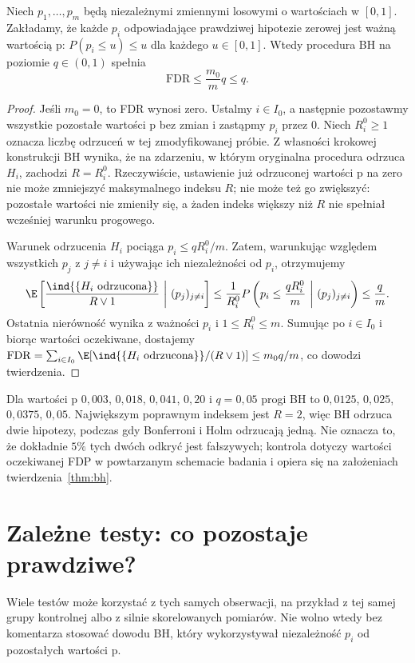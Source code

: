\begin{twierdzenie}
\label{thm:bh}
Niech $p_1,\ldots,p_m$ będą niezależnymi zmiennymi
losowymi o wartościach w $[0,1]$. Zakładamy, że
każde $p_i$ odpowiadające prawdziwej hipotezie zerowej
jest ważną wartością p:
$P(p_i\le u)\le u$ dla każdego $u\in[0,1]$.
Wtedy procedura BH na poziomie $q\in(0,1)$ spełnia
\[
 \mathrm{FDR}\le\frac{m_0}{m}q\le q.
\]
\end{twierdzenie}
\begin{proof}
Jeśli $m_0=0$, to FDR wynosi zero. Ustalmy
$i\in I_0$, a następnie pozostawmy wszystkie pozostałe
wartości p bez zmian i zastąpmy $p_i$ przez $0$.
Niech $R_i^0\ge1$ oznacza liczbę odrzuceń w tej
zmodyfikowanej próbie. Z własności krokowej konstrukcji
BH wynika, że na zdarzeniu, w którym oryginalna
procedura odrzuca $H_i$, zachodzi $R=R_i^0$.
Rzeczywiście, ustawienie już odrzuconej wartości p na
zero nie może zmniejszyć maksymalnego indeksu $R$;
nie może też go zwiększyć: pozostałe wartości nie
zmieniły się, a żaden indeks większy niż $R$ nie
spełniał wcześniej warunku progowego.

Warunek odrzucenia $H_i$ pociąga
$p_i\le qR_i^0/m$. Zatem, warunkując względem
wszystkich $p_j$ z $j\ne i$ i używając ich
niezależności od $p_i$, otrzymujemy
\[
 \E\left[\frac{\ind{\{H_i\ \text{odrzucona}\}}}{R\vee1}
 \ \middle|\ (p_j)_{j\ne i}\right]
 \le\frac1{R_i^0}P\left(p_i\le\frac{qR_i^0}{m}
 \ \middle|\ (p_j)_{j\ne i}\right)
 \le\frac q m.
\]
Ostatnia nierówność wynika z ważności $p_i$ i
$1\le R_i^0\le m$. Sumując po $i\in I_0$
i biorąc wartości oczekiwane, dostajemy
$\mathrm{FDR}=\sum_{i\in I_0}
\E[\ind{\{H_i\ \text{odrzucona}\}}/(R\vee1)]
\le m_0q/m$, co dowodzi twierdzenia.
\end{proof}

\begin{przyklad}
Dla wartości p $0{,}003$, $0{,}018$, $0{,}041$, $0{,}20$
i $q=0{,}05$ progi BH to
$0{,}0125$, $0{,}025$, $0{,}0375$, $0{,}05$.
Największym poprawnym indeksem jest $R=2$, więc BH
odrzuca dwie hipotezy, podczas gdy Bonferroni i Holm
odrzucają jedną. Nie oznacza to, że dokładnie
$5\%$ tych dwóch odkryć jest fałszywych; kontrola
dotyczy wartości oczekiwanej FDP w powtarzanym
schemacie badania i opiera się na założeniach
twierdzenia~\ref{thm:bh}.
\end{przyklad}

\section{Zależne testy: co pozostaje prawdziwe?}
Wiele testów może korzystać z tych samych obserwacji,
na przykład z tej samej grupy kontrolnej albo z silnie
skorelowanych pomiarów. Nie wolno wtedy bez komentarza
stosować dowodu BH, który wykorzystywał niezależność
$p_i$ od pozostałych wartości p.


